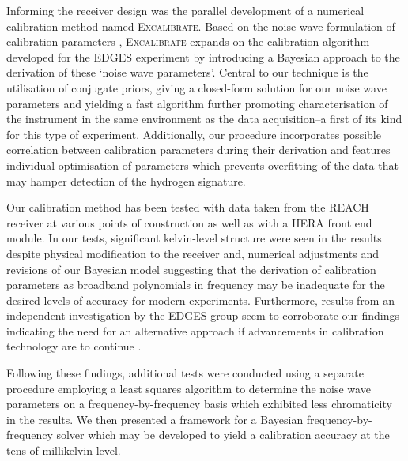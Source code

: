 Informing the receiver design was the parallel development of a numerical calibration method named \textsc{Excalibrate}. Based on the noise wave formulation of calibration parameters \citep{meys}, \textsc{Excalibrate} expands on the calibration algorithm developed for the EDGES experiment \citep{edgesCal} by introducing a Bayesian approach to the derivation of these ‘noise wave parameters’. Central to our technique is the utilisation of conjugate priors, giving a closed-form solution for our noise wave parameters and yielding a fast algorithm further promoting characterisation of the instrument in the same environment as the data acquisition--a first of its kind for this type of experiment. Additionally, our procedure incorporates possible correlation between calibration parameters during their derivation and features individual optimisation of parameters which prevents overfitting of the data that may hamper detection of the hydrogen signature.

Our calibration method has been tested with data taken from the REACH receiver at various points of construction as well as with a HERA front end module. In our tests, significant kelvin-level structure were seen in the results despite physical modification to the receiver and, numerical adjustments and revisions of our Bayesian model suggesting that the derivation of calibration parameters as broadband polynomials in frequency may be inadequate for the desired levels of accuracy for modern experiments. Furthermore, results from an independent investigation by the EDGES group seem to corroborate our findings indicating the need for an alternative approach if advancements in calibration technology are to continue \citep{murray_calpap}.

Following these findings, additional tests were conducted using a separate procedure employing a least squares algorithm to determine the noise wave parameters on a frequency-by-frequency basis which exhibited less chromaticity in the results. We then presented a framework for a Bayesian frequency-by-frequency solver which may be developed to yield a calibration accuracy at the tens-of-millikelvin level.


